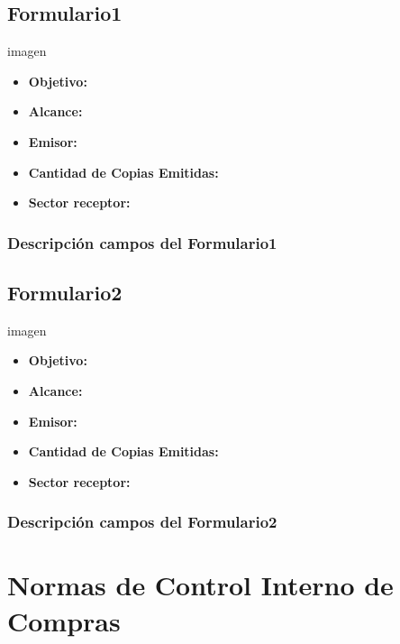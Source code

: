 \subsection{Formulario1}
imagen
\begin{itemize}
  \item \textbf{Objetivo:}
  \item \textbf{Alcance:}
  \item \textbf{Emisor:}
  \item \textbf{Cantidad de Copias Emitidas:}
  \item \textbf{Sector receptor:}
 \end{itemize}
\subsubsection{Descripci\'on campos del Formulario1}

\subsection{Formulario2}
imagen
\begin{itemize}
  \item \textbf{Objetivo:}
  \item \textbf{Alcance:}
  \item \textbf{Emisor:}
  \item \textbf{Cantidad de Copias Emitidas:}
  \item \textbf{Sector receptor:}
 \end{itemize}
\subsubsection{Descripci\'on campos del Formulario2}

\pagebreak
\section{Normas de Control Interno de Compras}